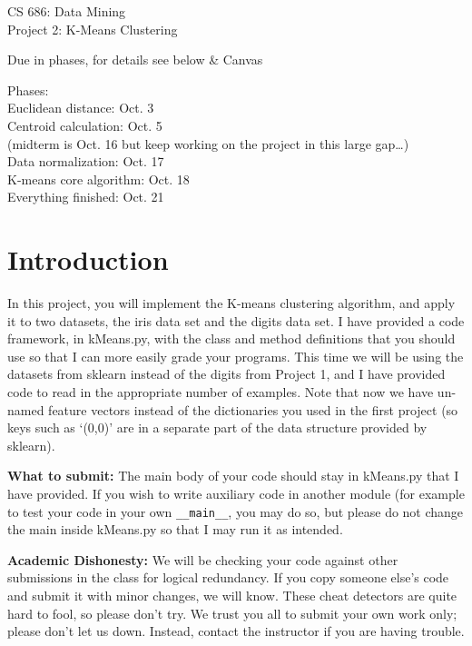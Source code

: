 \documentclass[11pt]{article}
\begin{document}
\Large
\begin{center}
CS 686: Data Mining\\
Project 2: K-Means Clustering\\

\smallskip

Due in phases, for details see below \& Canvas\\
\end{center}

\noindent 
Phases:\\
Euclidean distance: Oct. 3\\
Centroid calculation: Oct. 5\\
(midterm is Oct. 16 but keep working on the project in this large gap\ldots)\\
Data normalization: Oct. 17\\
K-means core algorithm: Oct. 18\\
Everything finished: Oct. 21

\normalsize

\section*{Introduction}

In this project, you will implement the K-means clustering algorithm,
and apply it to two datasets, the iris data set and the digits data set.
I have provided a code framework, in kMeans.py, with the class and method definitions that you should use so that I can more easily grade your programs.
 This time we will be using the datasets from sklearn instead of the digits from Project 1, and I have provided code to read in the appropriate number of examples. 
 Note that now we have un-named feature vectors instead of the dictionaries you used in the first project (so keys such as `(0,0)' are in a separate part of the data structure provided by sklearn).

\vspace{0.5cm}

\noindent
\textbf{What to submit:} The main body of your code should stay in kMeans.py that I have provided. If you wish to write auxiliary code in another module
(for example to test your code in your own \texttt{\_\_main\_\_},  you may do so,
 but please do not change the main inside kMeans.py so that I may run it as intended.

\vspace{0.5cm}

\noindent\textbf{Academic Dishonesty:} We will be checking your code against other submissions in the class for logical redundancy. If you copy someone else's code and submit it with minor changes, we will know. These cheat detectors are quite hard to fool, so please don't try. We trust you all to submit your own work only; please don't let us down. Instead, contact the instructor if you are having trouble. 
\end{document}

